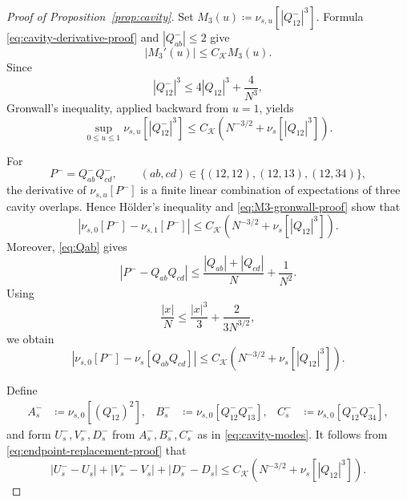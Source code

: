 \documentclass[11pt]{article}
\numberwithin{equation}{section}
\newcommand{\1}{\mathbf 1}
\newcommand{\cK}{\mathcal K}
\begin{document}
\begin{proof}[Proof of Proposition~\ref{prop:cavity}]
Set $M_3(u)\coloneqq\nu_{s,u}[|Q^-_{12}|^3]$.  Formula
\eqref{eq:cavity-derivative-proof} and $|Q^-_{ab}|\le2$ give
\[
 |M_3'(u)|\le C_{\cK}M_3(u).
\]
Since
\[
 |Q^-_{12}|^3\le4|Q_{12}|^3+\frac4{N^3},
\]
Gronwall's inequality, applied backward from $u=1$, yields
\begin{equation}
 \sup_{0\le u\le1}\nu_{s,u}[|Q^-_{12}|^3]
 \le C_{\cK}(N^{-3/2}+\nu_s[|Q_{12}|^3]).
 \label{eq:M3-gronwall-proof}
\end{equation}

For
\[
 P^-=Q^-_{ab}Q^-_{cd},
 \qquad (ab,cd)\in\{(12,12),(12,13),(12,34)\},
\]
the derivative of $\nu_{s,u}[P^-]$ is a finite linear combination of
expectations of three cavity overlaps.  Hence H\"older's inequality and
\eqref{eq:M3-gronwall-proof} show that
\[
 |\nu_{s,0}[P^-]-\nu_{s,1}[P^-]|
 \le C_{\cK}(N^{-3/2}+\nu_s[|Q_{12}|^3]).
\]
Moreover, \eqref{eq:Qab} gives
\[
 |P^--Q_{ab}Q_{cd}|
 \le\frac{|Q_{ab}|+|Q_{cd}|}{N}+\frac1{N^2}.
\]
Using
\[
 \frac{|x|}{N}\le\frac{|x|^3}{3}+\frac{2}{3N^{3/2}},
\]
we obtain
\begin{equation}
 \left|\nu_{s,0}[P^-]-\nu_s[Q_{ab}Q_{cd}]\right|
 \le C_{\cK}(N^{-3/2}+\nu_s[|Q_{12}|^3]).
 \label{eq:endpoint-replacement-proof}
\end{equation}

Define
\begin{align*}
 A_s^-&\coloneqq\nu_{s,0}[(Q^-_{12})^2],&
 B_s^-&\coloneqq\nu_{s,0}[Q^-_{12}Q^-_{13}],&
 C_s^-&\coloneqq\nu_{s,0}[Q^-_{12}Q^-_{34}],
\end{align*}
and form $U_s^-,V_s^-,D_s^-$ from $A_s^-,B_s^-,C_s^-$ as in
\eqref{eq:cavity-modes}.  It follows from
\eqref{eq:endpoint-replacement-proof} that
\begin{equation}
 |U_s^--U_s|+|V_s^--V_s|+|D_s^--D_s|
 \le C_{\cK}(N^{-3/2}+\nu_s[|Q_{12}|^3]).
 \label{eq:cavity-mode-replacement}
\end{equation}


\end{proof}
\end{document}
